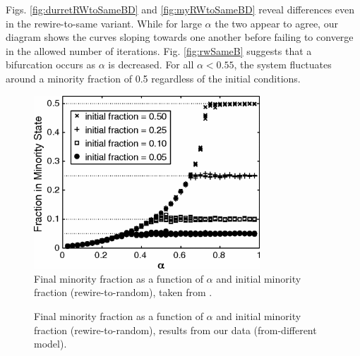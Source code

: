 \documentclass[11pt]{article}
\begin{document}
Figs. \ref{fig:durretRWtoSameBD} and \ref{fig:myRWtoSameBD} reveal differences even in the rewire-to-same variant. While for large $\alpha$ the two appear to agree, our diagram shows the curves sloping towards one another before failing to converge in the allowed number of iterations. Fig. \ref{fig:rwSameB} suggests that a bifurcation occurs as $\alpha$ is decreased. For all $\alpha<0.55$, the system fluctuates around a minority fraction of 0.5 regardless of the initial conditions.

\begin{figure}
  \centering
  \includegraphics[height=65mm]{rwToRandomBifDiag}
  \caption{Final minority fraction as a function of $\alpha$ and initial minority fraction (rewire-to-random), taken from \cite{durret:pnas12}.}
  \label{fig:durretRWtoRandomBD}
\end{figure}

\begin{figure}
  \centering
  \hspace{3mm}
  \caption{Final minority fraction as a function of $\alpha$ and initial minority fraction (rewire-to-random), results from our data (from-different model).}
  \label{fig:myRWtoRandomFromDiffBD}
\end{figure}
\end{document}

